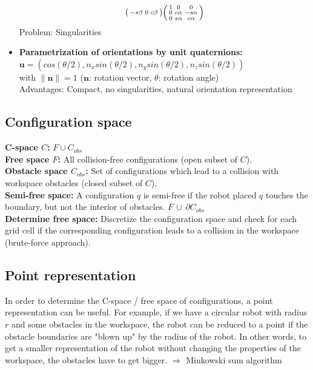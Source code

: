 \begin{multicols*}{2}
\begin{itemize}
\begin{align*}
\begin{psmallmatrix}
			-s\beta & 0 & c\beta
		\end{psmallmatrix}
		\begin{psmallmatrix}
			1 & 0 & 0\\
			0 & c\alpha & -s\alpha\\
			0 & s\alpha & c\alpha
		\end{psmallmatrix}
	\end{align*}
	Problem: Singularities
	\item \textbf{Parametrization of orientations by unit quaternions:}\\
	$\mathbold{u} = (cos(\theta/2), n_x sin(\theta/2), n_y sin(\theta/2), n_z sin(\theta/2))$\\
	with $\lVert \mathbold{n} \rVert = 1$ ($\mathbold{n}$: rotation vector, $\theta$: rotation angle)\\
	Advantages: Compact, no singularities, natural orientation representation
\end{itemize}

\subsection{Configuration space}
\textbf{C-space $C$:} $F \cup C_{obs}$\\
\textbf{Free space $F$:} All collision-free configurations (open subset of $C$).\\
\textbf{Obstacle space $C_{obs}$:} Set of configurations which lead to a collision with workspace obstacles (closed subset of $C$).\\
\textbf{Semi-free space:} A configuration $q$ is semi-free if the robot placed $q$ touches the boundary, but not the interior of obstacles. $F \, \cup \, \partial C_{obs}$\\
\textbf{Determine free space:} Discretize the configuration space and check for each grid cell if the corresponding configuration leads to a collision in the workspace (brute-force approach).

\subsection{Point representation}
In order to determine the C-space / free space of configurations, a point representation can be useful. For example, if we have a circular robot with radius $r$ and some obstacles in the workspace, the robot can be reduced to a point if the obstacle boundaries are "blown up" by the radius of the robot. In other words, to get a smaller representation of the robot without changing the properties of the workspace, the obstacles have to get bigger. 
$\Rightarrow$ Minkowski sum algorithm


\end{multicols*}
